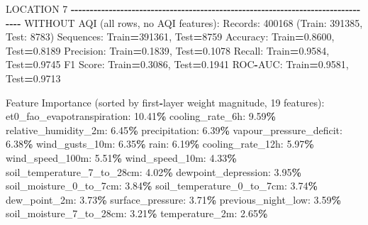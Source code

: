 \documentclass[
  letterpaper,
  DIV=11,
  numbers=noendperiod]{scrartcl}
\newenvironment{Shaded}{\begin{snugshade}}{\end{snugshade}}
\newcommand{\BuiltInTok}[1]{#1}
\newcommand{\DecValTok}[1]{\textcolor[rgb]{0.00,0.00,0.81}{#1}}
\newcommand{\FloatTok}[1]{\textcolor[rgb]{0.00,0.00,0.81}{#1}}
\newcommand{\NormalTok}[1]{#1}
\newcommand{\OperatorTok}[1]{\textcolor[rgb]{0.81,0.36,0.00}{\textbf{#1}}}
\begin{document}
\begin{Shaded}
\begin{Highlighting}[]
\NormalTok{LOCATION }\DecValTok{7}
\OperatorTok{{-}{-}{-}{-}{-}{-}{-}{-}{-}{-}{-}{-}{-}{-}{-}{-}{-}{-}{-}{-}{-}{-}{-}{-}{-}{-}{-}{-}{-}{-}{-}{-}{-}{-}{-}{-}{-}{-}{-}{-}{-}{-}{-}{-}{-}{-}{-}{-}{-}{-}{-}{-}{-}{-}{-}{-}{-}{-}{-}{-}{-}{-}{-}{-}{-}{-}{-}{-}{-}{-}{-}{-}{-}{-}{-}{-}{-}{-}{-}{-}}
\NormalTok{WITHOUT AQI (}\BuiltInTok{all}\NormalTok{ rows, no AQI features):}
\NormalTok{  Records: }\DecValTok{400168}\NormalTok{ (Train: }\DecValTok{391385}\NormalTok{, Test: }\DecValTok{8783}\NormalTok{)}
\NormalTok{  Sequences: Train}\OperatorTok{=}\DecValTok{391361}\NormalTok{, Test}\OperatorTok{=}\DecValTok{8759}
\NormalTok{  Accuracy: Train}\OperatorTok{=}\FloatTok{0.8600}\NormalTok{, Test}\OperatorTok{=}\FloatTok{0.8189}
\NormalTok{  Precision: Train}\OperatorTok{=}\FloatTok{0.1839}\NormalTok{, Test}\OperatorTok{=}\FloatTok{0.1078}
\NormalTok{  Recall: Train}\OperatorTok{=}\FloatTok{0.9584}\NormalTok{, Test}\OperatorTok{=}\FloatTok{0.9745}
\NormalTok{  F1 Score: Train}\OperatorTok{=}\FloatTok{0.3086}\NormalTok{, Test}\OperatorTok{=}\FloatTok{0.1941}
\NormalTok{  ROC}\OperatorTok{{-}}\NormalTok{AUC: Train}\OperatorTok{=}\FloatTok{0.9581}\NormalTok{, Test}\OperatorTok{=}\FloatTok{0.9713}

\NormalTok{  Feature Importance (}\BuiltInTok{sorted}\NormalTok{ by first}\OperatorTok{{-}}\NormalTok{layer weight magnitude, }\DecValTok{19}\NormalTok{ features):}
\NormalTok{    et0\_fao\_evapotranspiration: }\FloatTok{10.41}\OperatorTok{\%}
\NormalTok{    cooling\_rate\_6h: }\FloatTok{9.59}\OperatorTok{\%}
\NormalTok{    relative\_humidity\_2m: }\FloatTok{6.45}\OperatorTok{\%}
\NormalTok{    precipitation: }\FloatTok{6.39}\OperatorTok{\%}
\NormalTok{    vapour\_pressure\_deficit: }\FloatTok{6.38}\OperatorTok{\%}
\NormalTok{    wind\_gusts\_10m: }\FloatTok{6.35}\OperatorTok{\%}
\NormalTok{    rain: }\FloatTok{6.19}\OperatorTok{\%}
\NormalTok{    cooling\_rate\_12h: }\FloatTok{5.97}\OperatorTok{\%}
\NormalTok{    wind\_speed\_100m: }\FloatTok{5.51}\OperatorTok{\%}
\NormalTok{    wind\_speed\_10m: }\FloatTok{4.33}\OperatorTok{\%}
\NormalTok{    soil\_temperature\_7\_to\_28cm: }\FloatTok{4.02}\OperatorTok{\%}
\NormalTok{    dewpoint\_depression: }\FloatTok{3.95}\OperatorTok{\%}
\NormalTok{    soil\_moisture\_0\_to\_7cm: }\FloatTok{3.84}\OperatorTok{\%}
\NormalTok{    soil\_temperature\_0\_to\_7cm: }\FloatTok{3.74}\OperatorTok{\%}
\NormalTok{    dew\_point\_2m: }\FloatTok{3.73}\OperatorTok{\%}
\NormalTok{    surface\_pressure: }\FloatTok{3.71}\OperatorTok{\%}
\NormalTok{    previous\_night\_low: }\FloatTok{3.59}\OperatorTok{\%}
\NormalTok{    soil\_moisture\_7\_to\_28cm: }\FloatTok{3.21}\OperatorTok{\%}
\NormalTok{    temperature\_2m: }\FloatTok{2.65}\OperatorTok{\%}


\end{Highlighting}
\end{Shaded}
\end{document}
